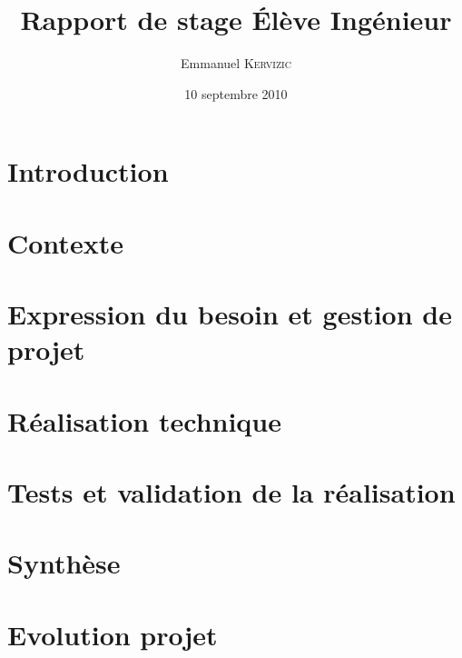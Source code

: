 

\date{10 septembre 2010}
\title{Rapport de stage Élève Ingénieur}
\author{Emmanuel \textsc{Kervizic}}



\maketitle

\renewcommand{\baselinestretch}{0.8}\small \normalsize
\setcounter{tocdepth}{2}  
\tableofcontents
\renewcommand{\baselinestretch}{1.18}\small \normalsize

\chapter*{Introduction} %


\chapter{Contexte}


\chapter{Expression du besoin et gestion de projet}



\chapter{Réalisation technique}


\chapter{Tests et validation de la réalisation}


\chapter{Synthèse}



\chapter{Evolution projet}





\appendix
%

%
%





